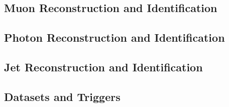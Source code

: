 \subsection{Muon Reconstruction and Identification}
\label{sec:HZZ4lmuons}

\subsection{Photon Reconstruction and Identification}
\label{sec:HZZ4lphotons}

\subsection{Jet Reconstruction and Identification}
\label{sec:HZZ4ljets}

\subsection{Datasets and Triggers}
\label{sec:HZZ4ldatasets}
